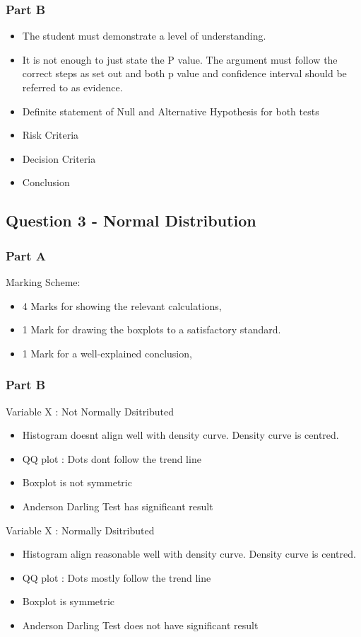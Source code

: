 \documentclass[a4paper,12pt]{article}
\begin{document}
\subsubsection*{Part B}
\begin{itemize}
	\item The student must demonstrate a level of understanding.
	\item  It is not enough to just state
	the P value. The argument must follow the correct steps as set out and both p value
	and confidence interval should be referred to as evidence.
	\item Definite statement of Null and Alternative Hypothesis for both tests
	\item Risk Criteria
	\item Decision Criteria
	\item Conclusion
\end{itemize}

\newpage
\subsection*{Question 3 - Normal Distribution}
\subsubsection*{Part A}

\noindent Marking Scheme:
\begin{itemize}
	\item 4 Marks for showing the relevant calculations,
	\item 1 Mark for drawing the boxplots to a satisfactory standard.
	\item 1 Mark for a well-explained conclusion,
\end{itemize}



\subsubsection*{Part B}
Variable X : Not Normally Dsitributed
\begin{itemize}
	\item Histogram doesnt align well with density curve. Density curve is centred.
	\item QQ plot : Dots dont follow the trend line
	\item Boxplot is not symmetric
	\item Anderson Darling Test has significant result
\end{itemize}
Variable X :  Normally Dsitributed
\begin{itemize}
	\item Histogram align reasonable well with density curve. Density curve is centred.
	\item QQ plot : Dots mostly follow the trend line
	\item Boxplot is symmetric
	\item Anderson Darling Test does not have significant result
\end{itemize}
\end{document}

